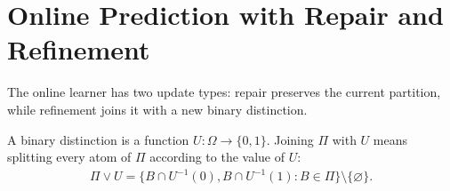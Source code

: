 \section{Online Prediction with Repair and Refinement}
\label{sec:online-model}

The online learner has two update types: repair preserves the current partition, while refinement joins it with a new binary distinction.

\begin{definition}
\label{def:partition-join}
A binary distinction is a function $U:\Omega\to\{0,1\}$. Joining $\Pi$ with $U$ means splitting every atom of $\Pi$ according to the value of $U$:
\begin{align}
\Pi\vee U
=
\{B\cap U^{-1}(0),B\cap U^{-1}(1):B\in\Pi\}\setminus\{\varnothing\}.
\label{eq:partition-join}
\end{align}
\end{definition}

